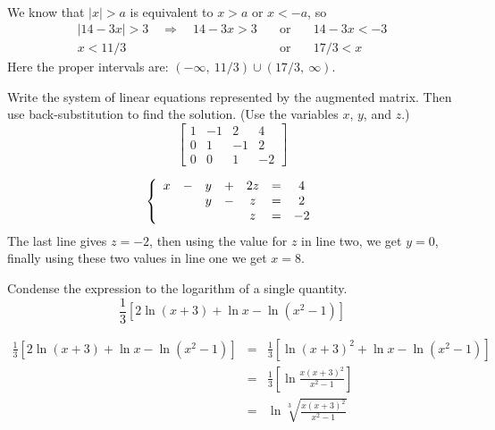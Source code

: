 \documentclass[12pt,addpoints, answers, fleqn]{exam}
\begin{document}
\begin{questions}
\begin{solution}
\begin{eqnarray*}
\end{eqnarray*}
We know that $\left|  x  \right| > a$ is equivalent to $x > a$ or $x< -a$, so
\begin{eqnarray*}
\left|  14-3x  \right|  > 3 \quad \Rightarrow  \quad 14-3x > 3 \quad &\mbox{or}& \quad 14-3x < -3\\
x < 11/3 \quad &\mbox{or}& \quad 17/3  < x
\end{eqnarray*}
Here the proper intervals are: $\boxed{\left(-\infty, \ 11/3 \right) \cup \left( 17/3, \ \infty \right)}$.
\end{solution}
\question Write the system of linear equations represented by the augmented matrix. Then use back-substitution to find the solution. (Use the variables $x$, $y$, and $z$.)
\[
\left[ {\begin{array}{rrr|r}
   {1} & {-1} & {2} & {4} \\
   {0} & {1} & {-1}  & {2}\\
{0} & {0} & {1}  & {-2}
\end{array}} \right]
\]
\begin{solution}
\[
\left\{ {\begin{array}{*{20}c}
   {x} &  -  & {y} &  +  & {2z} &  =  & 4  \\
   {} &    & {y} &  -  & {z} &  =  & 2  \\
   {} &    & {} &    & {z} &  =  & -2  \\
\end{array}} \right.
\]
The last line gives $\boxed{z = -2}$, then using the value for $z$ in line two, we get $\boxed{y = 0}$, finally using these two values in line one we get $\boxed{x = 8}$.
\end{solution}
\question Condense the expression to the logarithm of a single quantity.
\[
\frac{1}{3} \left[ 2 \ln \left( x+3 \right) + \ln x - \ln \left( x^2 - 1\right) \right]
\]
\begin{solution}
\begin{eqnarray*}
\frac{1}{3} \left[ 2 \ln \left( x+3 \right) + \ln x - \ln \left( x^2 - 1\right) \right] &=& \frac{1}{3} \left[  \ln \left( x+3 \right)^2 + \ln x - \ln \left( x^2 - 1\right) \right]\\
&=& \frac{1}{3} \left[  \ln \frac{x\left( x+3 \right)^2}{x^2 - 1} \right]\\
&=& \boxed{\ln \sqrt[3]{\frac{x\left( x+3 \right)^2}{x^2 - 1}}}
\end{eqnarray*}

\end{solution}
\end{questions}
\end{document}
